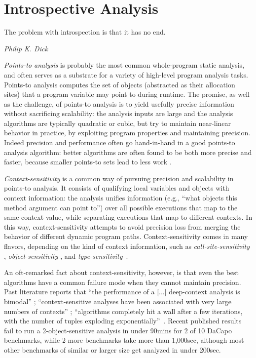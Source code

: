 \chapter{Introspective Analysis} \label{chapter:introspective}

\epigraph{The problem with introspection is that it has no end.}{\textit{Philip K. Dick}}

\emph{Points-to analysis} is probably the most common whole-program
static analysis, and often serves as a substrate for a variety of
high-level program analysis tasks. Points-to analysis computes the set
of objects (abstracted as their allocation sites) that a program
variable may point to during runtime. The promise, as well as the
challenge, of points-to analysis is to yield usefully precise
information without sacrificing scalability: the analysis inputs are
large and the analysis algorithms are typically quadratic or cubic,
but try to maintain near-linear behavior in practice, by exploiting
program properties and maintaining precision. Indeed precision and
performance often go hand-in-hand in a good points-to analysis
algorithm: better algorithms are often found to be both more precise
and faster, because smaller points-to sets lead to less work
\cite{article:2008:tosem:Lhotak}.

\emph{Context-sensitivity} is a common way of pursuing precision and
scalability in points-to analysis. It consists of qualifying local
variables and objects with context information: the analysis unifies
information (e.g., ``what objects this method argument can point to'')
over all possible executions that map to the same context value, while
separating executions that map to different contexts. In this way,
context-sensitivity attempts to avoid precision loss from merging the
behavior of different dynamic program paths. Context-sensitivity comes
in many flavors, depending on the kind of context information, such as
\emph{call-site-sensitivity}
\cite{col:1981:Sharir,thesis:Shivers},
\emph{object-sensitivity}
\cite{issta:2002:Milanova,article:2005:Milanova}, and
\emph{type-sensitivity}~\cite{popl:2011:Smaragdakis}.

An oft-remarked fact about context-sensitivity, however, is that even
the best algorithms have a common failure mode when they cannot
maintain precision. Past literature reports that ``the performance of
a [...]  deep-context analysis is bimodal'' \cite{popl:2011:Smaragdakis};
``context-sensitive analyses have been associated with very large
numbers of contexts'' \cite{cc:2006:Lhotak}; ``algorithms
completely hit a wall after a few iterations, with the number of
tuples exploding
exponentially''~\cite{pldi:2011:Liang}.  Recent
published results~\cite{pldi:2013:Kastrinis} fail to run a
2-object-sensitive analysis in under 90mins for 2 of 10 DaCapo
benchmarks, while 2 more benchmarks take more than 1,000sec, although
most other benchmarks of similar or larger size get analyzed in under
200sec.

